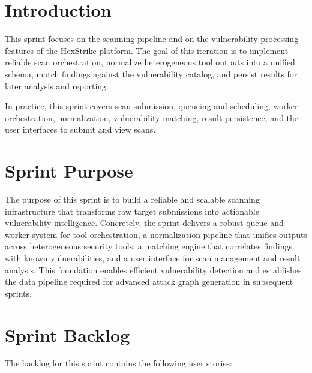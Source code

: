 ﻿\section{Introduction}

\justifying
This sprint focuses on the scanning pipeline and on the vulnerability processing features of the HexStrike platform. The goal of this iteration is to implement reliable scan orchestration, normalize heterogeneous tool outputs into a unified schema, match findings against the vulnerability catalog, and persist results for later analysis and reporting.

In practice, this sprint covers scan submission, queueing and scheduling, worker orchestration, normalization, vulnerability matching, result persistence, and the user interfaces to submit and view scans.

\section{Sprint Purpose}

\justifying
The purpose of this sprint is to build a reliable and scalable scanning infrastructure that transforms raw target submissions into actionable vulnerability intelligence. Concretely, the sprint delivers a robust queue and worker system for tool orchestration, a normalization pipeline that unifies outputs across heterogeneous security tools, a matching engine that correlates findings with known vulnerabilities, and a user interface for scan management and result analysis. This foundation enables efficient vulnerability detection and establishes the data pipeline required for advanced attack graph generation in subsequent sprints.

\section{Sprint Backlog}

The backlog for this sprint contains the following user stories:

